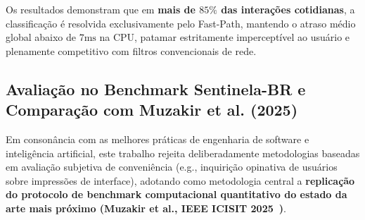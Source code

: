 Os resultados demonstram que em \textbf{mais de $85\%$ das intera\c{c}\~{o}es cotidianas}, a classifica\c{c}\~{a}o \'{e} resolvida exclusivamente pelo Fast-Path, mantendo o atraso m\'{e}dio global abaixo de $7\text{ms}$ na CPU, patamar estritamente impercept\'{i}vel ao usu\'{a}rio e plenamente competitivo com filtros convencionais de rede.

\subsection{Avalia\c{c}\~{a}o no Benchmark Sentinela-BR e Compara\c{c}\~{a}o com Muzakir et al. (2025)}
\label{sec:benchmark_sentinela}

Em conson\^{a}ncia com as melhores pr\'{a}ticas de engenharia de software e intelig\^{e}ncia artificial, este trabalho rejeita deliberadamente metodologias baseadas em avalia\c{c}\~{a}o subjetiva de conveni\^{e}ncia (e.g., inquiri\c{c}\~{a}o opinativa de usu\'{a}rios sobre impress\~{o}es de interface), adotando como metodologia central a \textbf{replica\c{c}\~{a}o do protocolo de benchmark computacional quantitativo do estado da arte mais pr\'{o}ximo (Muzakir et al., IEEE ICISIT 2025~\cite{muzakir2025text})}.


